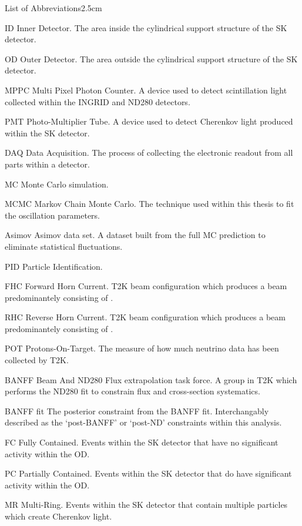 \begin{mclistof}{List of Abbreviations}{2.5cm}
\item[ID]Inner Detector. The area inside the cylindrical support structure of the SK detector.
\item[OD]Outer Detector. The area outside the cylindrical support structure of the SK detector.

\item[MPPC]Multi Pixel Photon Counter. A device used to detect scintillation light collected within the INGRID and ND280 detectors.
\item[PMT]Photo-Multiplier Tube. A device used to detect Cherenkov light produced within the SK detector.
\item[DAQ]Data Acquisition. The process of collecting the electronic readout from all parts within a detector.

\item[MC]Monte Carlo simulation.  
\item[MCMC]Markov Chain Monte Carlo. The technique used within this thesis to fit the oscillation parameters.
\item[Asimov]Asimov data set. A dataset built from the full MC prediction to eliminate statistical fluctuations.

\item[PID]Particle Identification.

\item[FHC]Forward Horn Current. T2K beam configuration which produces a beam predominantely consisting of \quickmath{\nu_\mu}.
\item[RHC]Reverse Horn Current. T2K beam configuration which produces a beam predominantely consisting of \quickmath{\bar{\nu}_\mu}.
\item[POT]Protons-On-Target. The measure of how much neutrino data has been collected by T2K.
\item[BANFF]Beam And ND280 Flux extrapolation task force. A group in T2K which performs the ND280 fit to constrain flux and cross-section systematics. 
\item[BANFF fit]The posterior constraint from the BANFF fit. Interchangably described as the `post-BANFF' or `post-ND' constraints within this analysis.

\item[FC]Fully Contained. Events within the SK detector that have no significant activity within the OD.
\item[PC]Partially Contained. Events within the SK detector that do have significant activity within the OD.
\item[MR]Multi-Ring. Events within the SK detector that contain multiple particles which create Cherenkov light.


\end{mclistof}
